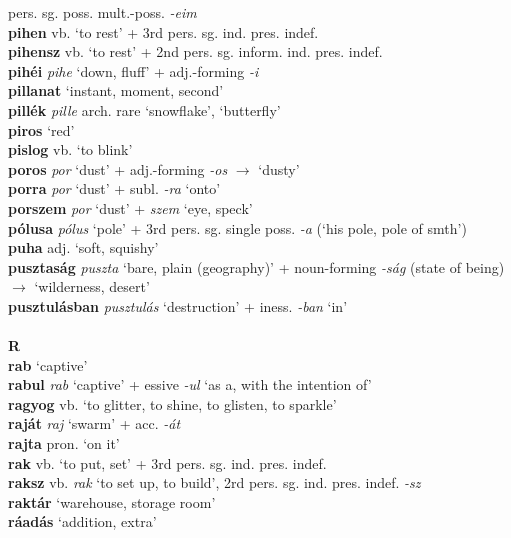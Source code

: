 \documentclass[11pt]{article}
\begin{document}
pers. sg. poss. mult.\hyp{}poss. \emph{-eim} \\
\textbf{pihen} vb. `to rest' + 3rd pers. sg. ind. pres. indef. \\
\textbf{pihensz} vb. `to rest' + 2nd
pers. sg. inform. ind. pres. indef. \\
\textbf{pihéi} \emph{pihe} `down, fluff' + adj.\hyp{}forming \emph{-i} \\
\textbf{pillanat} `instant, moment, second' \\
\textbf{pillék} \emph{pille} arch. rare `snowflake', `butterfly' \\
\textbf{piros} `red' \\
\textbf{pislog} vb. `to blink' \\
\textbf{poros} \emph{por} `dust' + adj.\hyp{}forming \emph{-os}
$\rightarrow$ `dusty' \\
\textbf{porra} \emph{por} `dust' + subl. \emph{-ra} `onto' \\
\textbf{porszem} \emph{por} `dust' + \emph{szem} `eye, speck' \\
\textbf{pólusa} \emph{pólus} `pole' + 3rd pers. sg. single
poss. \emph{-a} (`his pole, pole of smth') \\
\textbf{puha} adj. `soft, squishy' \\
\textbf{pusztaság} \emph{puszta} `bare, plain (geography)' +
noun\hyp{}forming \emph{-ság} (state of being) $\rightarrow$
`wilderness, desert' \\
\textbf{pusztulásban} \emph{pusztulás} `destruction' +
iness. \emph{-ban} `in' \\
\ \\
\noindent \textbf{\large R} \\
\textbf{rab} `captive' \\
\textbf{rabul} \emph{rab} `captive' + essive
  \emph{-ul} `as a, with the intention of' \\
\textbf{ragyog} vb. `to glitter, to shine, to glisten, to sparkle' \\
\textbf{raját} \emph{raj} `swarm' + acc. \emph{-át} \\
\textbf{rajta} pron. `on it' \\
\textbf{rak} vb. `to put, set' + 3rd pers. sg. ind. pres. indef.\\
\textbf{raksz} vb. \emph{rak} `to set up, to build', 2rd
pers. sg. ind. pres. indef. \emph{-sz} \\
\textbf{raktár} `warehouse, storage room' \\
\textbf{ráadás} `addition, extra' \\
\end{document}
